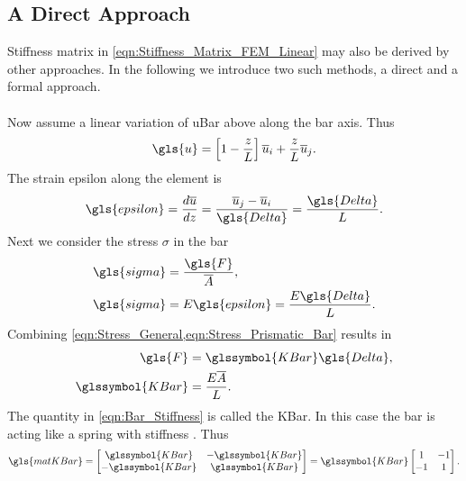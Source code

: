 \subsection{A Direct Approach}
Stiffness matrix in \cref{eqn:Stiffness_Matrix_FEM_Linear} may also be derived by other approaches. In the following we introduce
two such methods, a direct and a formal approach.	\\	\\
Now assume a linear variation of \gls{uBar} above along the bar axis. Thus
\begin{equation}	\label{eqn:Disp_Direct}
	\gls{u} = \left[ 1 - \frac{z}{L} \right] \overline{u}_i + \frac{z}{L} \overline{u}_j.
\end{equation}
The strain \gls{epsilon} along the element is
\begin{equation}	\label{eqn:Strain_Prismatic_Bar_1}
	\gls{epsilon} = \frac{ d \overline{u} }{ dz } = \frac{ \overline{u}_j - \overline{u}_i }{ \gls{Delta} } =
	\frac{ \gls{Delta} }{ L }.
\end{equation}
Next we consider the stress $\sigma$ in the bar
\begin{subequations}
	\begin{align}
		\gls{sigma} &= \frac{ \gls{F} }{ \overline{A} },	\label{eqn:Stress_General}	\\
		\gls{sigma} &= E \gls{epsilon} = \frac{ E \gls{Delta} }{ L }.	\label{eqn:Stress_Prismatic_Bar}
	\end{align}
\end{subequations}
Combining \cref{eqn:Stress_General,eqn:Stress_Prismatic_Bar} results in
\begin{subequations}
	\begin{align}
		\gls{F} &= \glssymbol{KBar} \gls{Delta},	\label{eqn:Bar_Force}	\\
		\glssymbol{KBar} &= \frac{E \overline{A}}{ L }.	\label{eqn:Bar_Stiffness}
	\end{align}
\end{subequations}
The quantity  in \cref{eqn:Bar_Stiffness} is called the \gls{KBar}. In this case the bar is acting like a spring
with stiffness . Thus
\begin{equation}	\label{eqn:Stiffness_Matrix_Direct}
	\gls{matKBar} =
	\begin{bmatrix}
		\glssymbol{KBar}	&		-\glssymbol{KBar}	\\
		-\glssymbol{KBar}	&		 \glssymbol{KBar}
	\end{bmatrix} = \glssymbol{KBar}
	\begin{bmatrix}
		1		&		-1	\\
		-1	&		 1
	\end{bmatrix}.
\end{equation}
